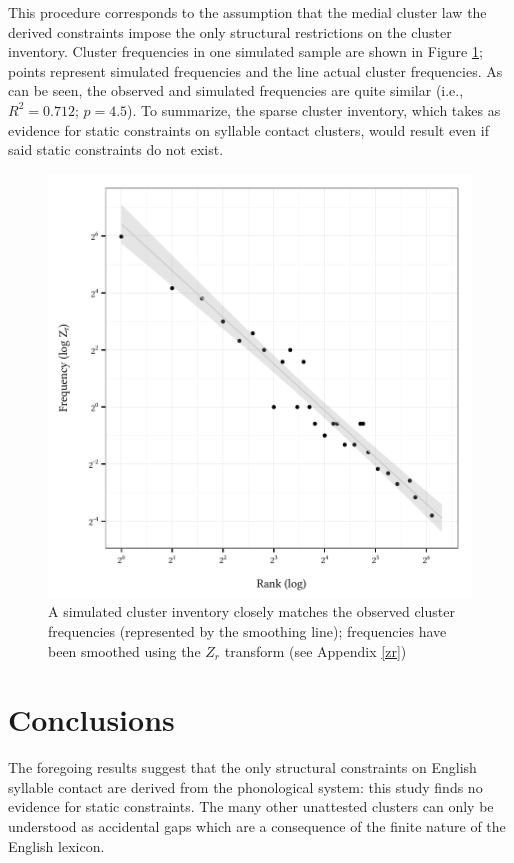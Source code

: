 This procedure corresponds to the assumption that the medial cluster law the derived constraints impose the only structural restrictions on the cluster inventory.
Cluster frequencies in one simulated sample are shown in Figure \ref{sim}; points represent simulated frequencies and the line actual cluster frequencies.
As can be seen, the observed and simulated frequencies are quite similar (i.e., $R^2 = 0.712$; $p = 4.5$).
To summarize, the sparse cluster inventory, which \citeauthor{Pierrehumbert1994} takes as evidence for static constraints on syllable contact clusters, would result even if said static constraints do not exist.

\begin{figure}[t]
\centering
\includegraphics{sim.pdf}
\caption{A simulated cluster inventory closely matches the observed cluster frequencies (represented by the smoothing line); frequencies have been smoothed using the $Z_r$ transform (see Appendix \ref{zr})}
\label{sim}
\end{figure}

\section{Conclusions}

The foregoing results suggest that the only structural constraints on English syllable contact are derived from the phonological system: this study finds no evidence for static constraints.
The many other unattested clusters can only be understood as accidental gaps which are a consequence of the finite nature of the English lexicon.

